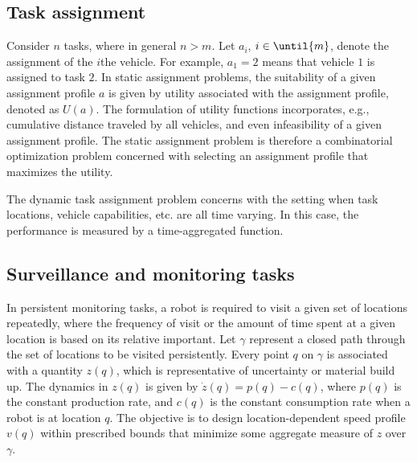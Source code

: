 \subsection{Task assignment}
Consider $n$ tasks, where in general $n > m$. Let $a_i$, $i \in \until{m}$, denote the assignment of the $i$the vehicle. For example, $a_1=2$ means that vehicle $1$ is assigned to task $2$. In static assignment problems, the suitability of a given assignment profile $a$ is given by utility associated with the assignment profile, denoted as $U(a)$. The formulation of utility functions incorporates, e.g., cumulative distance traveled by all vehicles, and even infeasibility of a given assignment profile. The static assignment problem is therefore a combinatorial optimization problem concerned with selecting an assignment profile that maximizes the utility.  

The dynamic task assignment problem concerns with the setting when task locations, vehicle capabilities, etc. are all time varying. In this case, the performance is measured by a time-aggregated function.  

\subsection{Surveillance and monitoring tasks}
In persistent monitoring tasks, a robot is required to visit a given set of locations repeatedly, where the frequency of visit or the amount of time spent at a given location is based on its relative important. Let $\gamma$ represent a closed path through the set of locations to be visited persistently. Every point $q$ on $\gamma$ is associated with a quantity $z(q)$, which is representative of uncertainty or material build up. The dynamics in $z(q)$ is given by $\dot{z}(q)=p(q)-c(q)$, where $p(q)$ is the constant production rate, and $c(q)$ is the constant consumption rate when a robot is at location $q$. The objective is to design location-dependent speed profile $v(q)$ within prescribed bounds that minimize some aggregate measure of $z$ over $\gamma$.












